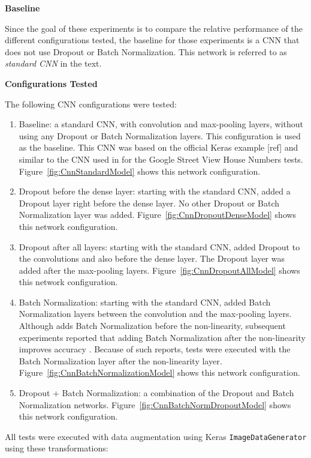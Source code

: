\documentclass[../CAP6619_term_project_cgarbin.tex]{subfiles}
\begin{document}
\medskip
\textbf{Baseline}

Since the goal of these experiments is to compare the relative performance of the different configurations tested, the baseline for those experiments is a CNN that does not use Dropout or Batch Normalization. This network is referred to as \textit{standard CNN} in the text.

\medskip
\textbf{Configurations Tested}

The following CNN configurations were tested:

\begin{enumerate}
\item Baseline: a standard CNN, with convolution and max-pooling layers, without using any Dropout or Batch Normalization layers. This configuration is used as the baseline. This CNN was based on the official Keras example [ref] and similar to the CNN used in \cite{Srivastava2014} for the Google Street View House Numbers tests. Figure~\ref{fig:CnnStandardModel} shows this network configuration.
\item Dropout before the dense layer: starting with the standard CNN, added a Dropout layer right before the dense layer. No other Dropout or Batch Normalization layer was added. Figure~\ref{fig:CnnDropoutDenseModel} shows this network configuration.
\item Dropout after all layers: starting with the standard CNN, added Dropout to the convolutions and also before the dense layer. The Dropout layer was added after the max-pooling layers. Figure~\ref{fig:CnnDropoutAllModel} shows this network configuration.
 \item Batch Normalization: starting with the standard CNN, added Batch Normalization layers between the convolution and the max-pooling layers. Although \cite{Ioffe2015} adds Batch Normalization before the non-linearity, subsequent experiments reported that adding Batch Normalization after the non-linearity improves accuracy \cite{Mishkin2016}. Because of such reports, tests were executed with the Batch Normalization layer after the non-linearity layer. Figure~\ref{fig:CnnBatchNormalizationModel} shows this network configuration.
 \item Dropout + Batch Normalization: a combination of the Dropout and Batch Normalization networks. Figure~\ref{fig:CnnBatchNormDropoutModel} shows this network configuration.
\end{enumerate}

All tests were executed with data augmentation using Keras \verb|ImageDataGenerator| using these transformations:
\end{document}
